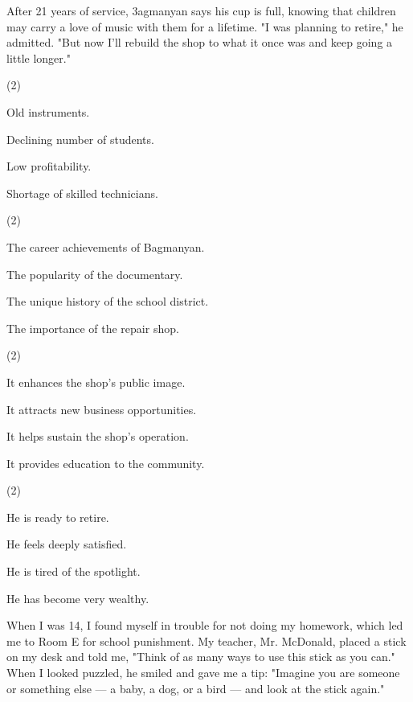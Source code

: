 \documentclass{英语试卷}
\begin{document}
\par After 21 years of service, 3agmanyan says his cup is full, knowing that children may carry a love of music with them for a lifetime. "I was planning to retire," he admitted. "But now I'll rebuild the shop to what it once was and keep going a little longer."\par
{}
\begin{choices}(2)
  \item Old instruments.
  \item Declining number of students.
  \item Low profitability.
  \item Shortage of skilled technicians.
\end{choices}
\begin{choices}(2)
  \item The career achievements of Bagmanyan.
  \item The popularity of the documentary.
  \item The unique history of the school district.
  \item The importance of the repair shop.
\end{choices}
\begin{choices}(2)
  \item It enhances the shop's public image.
  \item It attracts new business opportunities.
  \item It helps sustain the shop's operation.
  \item It provides education to the community.
\end{choices}
\begin{choices}(2)
  \item He is ready to retire.
  \item He feels deeply satisfied.
  \item He is tired of the spotlight.
  \item He has become very wealthy.
\end{choices}
\par When I was 14, I found myself in trouble for not doing my homework, which led me to Room E for school punishment. My teacher, Mr. McDonald, placed a stick on my desk and told me, "Think of as many ways to use this stick as you can." When I looked puzzled, he smiled and gave me a tip: "Imagine you are someone or something else — a baby, a dog, or a bird — and look at the stick again."\par
\end{document}
